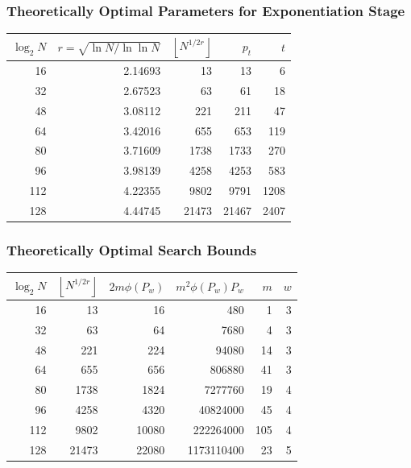 \documentclass{beamer}
\newcommand{\floor}[1]{\left\lfloor #1 \right\rfloor}
\begin{document}
\begin{frame}
\frametitle{Theoretically Optimal Parameters for Exponentiation Stage}
\begin{table}
\centering
\begin{tabular}{| r | r | r | r | r |}
\hline
$\log_2 N$ & $r = \sqrt{\ln N / \ln \ln N}$ & $\floor{N^{1/2r}}$ & $p_t$ & $t$ \\
\hline
16 & 2.14693 & 13 & 13 & 6 \\
32 & 2.67523 & 63 & 61 & 18 \\
48 & 3.08112 & 221 & 211 & 47 \\
64 & 3.42016 & 655 & 653 & 119 \\
80 & 3.71609 & 1738 & 1733 & 270 \\
96 & 3.98139 & 4258 & 4253 & 583 \\
112 & 4.22355 & 9802 & 9791 & 1208 \\
128 & 4.44745 & 21473 & 21467 & 2407 \\
\hline
\end{tabular}
\end{table}
\end{frame}

\begin{frame}
\frametitle{Theoretically Optimal Search Bounds}
\begin{table}
\centering
\begin{tabular}{| r | r | r | r | r | r |}
\hline
$\log_2 N$ & $\floor{N^{1/2r}}$ & $2m\phi(P_w)$ & $m^2\phi(P_w)P_w$ & $m$ & $w$ \\
\hline
16 & 13 & 16 & 480 & 1 & 3 \\
32 & 63 & 64 & 7680 & 4 & 3 \\
48 & 221 & 224 & 94080 & 14 & 3 \\
64 & 655 & 656 & 806880 & 41 & 3 \\
80 & 1738 & 1824 & 7277760 & 19 & 4 \\
96 & 4258 & 4320 & 40824000 & 45 & 4 \\
112 & 9802 & 10080 & 222264000 & 105 & 4 \\
128 & 21473 & 22080 & 1173110400 & 23 & 5 \\
\hline
\end{tabular}
\end{table}
\end{frame}
\end{document}
